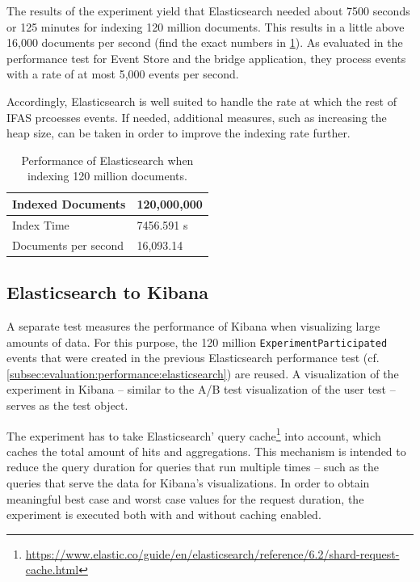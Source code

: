 The results of the experiment yield that Elasticsearch needed about 7500 seconds or 125 minutes for indexing 120 million documents.
This results in a little above 16,000 documents per second (find the exact numbers in \cref{table:elasticsearch-performance}).
As evaluated in the performance test for Event Store and the bridge application, they process events with a rate of at most 5,000 events per second.

Accordingly, Elasticsearch is well suited to handle the rate at which the rest of \ac{IFAS} prcoesses events.
If needed, additional measures, such as increasing the heap size, can be taken in order to improve the indexing rate further.

\begin{table}
\caption{Performance of Elasticsearch when indexing 120 million documents.}
\label{table:elasticsearch-performance}
\centering
\begin{tabular}{l|l}
Indexed Documents & 120,000,000 \\ \hline
Index Time & 7456.591 s \\ \hline
Documents per second & 16,093.14
\end{tabular}
\end{table}

\subsection{Elasticsearch to Kibana}
\label{subsec:evaluation:performance:kibana}

A separate test measures the performance of Kibana when visualizing large amounts of data.
For this purpose, the 120 million \texttt{ExperimentParticipated} events that were created in the previous Elasticsearch performance test (cf. \cref{subsec:evaluation:performance:elasticsearch}) are reused.
A visualization of the experiment in Kibana -- similar to the A/B test visualization of the user test -- serves as the test object.


The experiment has to take Elasticsearch' query cache\footnote{\url{https://www.elastic.co/guide/en/elasticsearch/reference/6.2/shard-request-cache.html}} into account, which caches the total amount of hits and aggregations.
This mechanism is intended to reduce the query duration for queries that run multiple times -- such as the queries that serve the data for Kibana's visualizations.
In order to obtain meaningful best case and worst case values for the request duration, the experiment is executed both with and without caching enabled.

